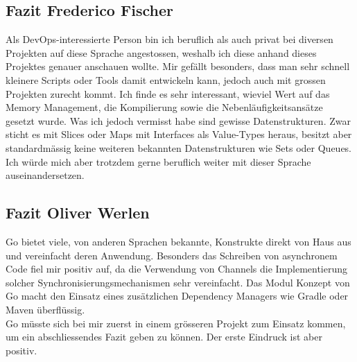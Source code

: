 \documentclass[12pt,titlepage]{article}
\begin{document}
\subsection{Fazit Frederico Fischer}
Als DevOps-interessierte Person bin ich beruflich als auch privat bei diversen Projekten auf diese Sprache angestossen, weshalb ich diese anhand dieses Projektes genauer anschauen wollte.
Mir gefällt besonders, dass man sehr schnell kleinere Scripts oder Tools damit entwickeln kann, jedoch auch mit grossen Projekten zurecht kommt.
Ich finde es sehr interessant, wieviel Wert auf das Memory Management, die Kompilierung sowie die Nebenläufigkeitsansätze gesetzt wurde.
Was ich jedoch vermisst habe sind gewisse Datenstrukturen.
Zwar sticht es mit Slices oder Maps mit Interfaces als Value-Types heraus, besitzt aber standardmässig keine weiteren bekannten Datenstrukturen wie Sets oder Queues.
Ich würde mich aber trotzdem gerne beruflich weiter mit dieser Sprache auseinandersetzen.

\subsection{Fazit Oliver Werlen}
Go bietet viele, von anderen Sprachen bekannte, Konstrukte direkt von Haus aus und vereinfacht deren Anwendung.
Besonders das Schreiben von asynchronem Code fiel mir positiv auf, da die Verwendung von Channels die Implementierung solcher Synchronisierungsmechanismen sehr vereinfacht.
Das Modul Konzept von Go macht den Einsatz eines zusätzlichen Dependency Managers wie Gradle oder Maven überflüssig. \\
Go müsste sich bei mir zuerst in einem grösseren Projekt zum Einsatz kommen, um ein abschliessendes Fazit geben zu können.
Der erste Eindruck ist aber positiv.

    
\end{document}
